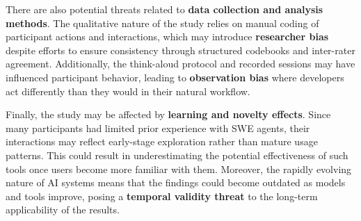 There are also potential threats related to \textbf{data collection and analysis methods}. The qualitative nature of the study relies on manual coding of participant actions and interactions, which may introduce \textbf{researcher bias} despite efforts to ensure consistency through structured codebooks and inter-rater agreement. Additionally, the think-aloud protocol and recorded sessions may have influenced participant behavior, leading to \textbf{observation bias} where developers act differently than they would in their natural workflow.

Finally, the study may be affected by \textbf{learning and novelty effects}. Since many participants had limited prior experience with SWE agents, their interactions may reflect early-stage exploration rather than mature usage patterns. This could result in underestimating the potential effectiveness of such tools once users become more familiar with them. Moreover, the rapidly evolving nature of AI systems means that the findings could become outdated as models and tools improve, posing a \textbf{temporal validity threat} to the long-term applicability of the results.
